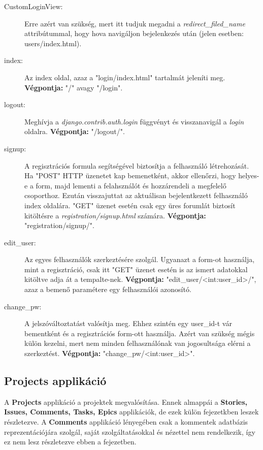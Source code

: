 \begin{itemize}
	\begin{description}
		\item[CustomLoginView:] Erre azért van szükség, mert itt tudjuk megadni a \textit{redirect\_filed\_name} attribútummal, hogy hova navigáljon bejelenkezés után (jelen esetben: users/index.html).
		\item[index:] Az index oldal, azaz a "login/index.html" tartalmát jeleníti meg. 
\textbf{Végpontja:} "/" avagy "/login".
		\item[logout:] Meghívja a  \textit{django.contrib.auth.login} függvényt és visszanavigál a \textit{login} oldalra. 
\textbf{Végpontja:} "/logout/".
		\item[signup:] A regisztrációs formula segítségével biztosítja a felhasználó létrehozását. Ha "POST" HTTP üzenetet kap bemenetként, akkor ellenőrzi, hogy helyes-e a form, majd lementi a felahsználót és hozzárendeli a megfelelő csoporthoz. Ezután visszajuttat az aktuálisan bejelentkezett felhasználó index oldalára. "GET" üzenet esetén csak egy üres forumlát biztosít kitöltésre a \textit{registration/signup.html} számára. 
\textbf{Végpontja:} "registration/signup/".
		\item[edit\_user:] Az egyes felhasználók szerkeztésére szolgál. Ugyanazt a form-ot használja, mint a regisztráció, csak itt "GET" üzenet esetén is az ismert adatokkal kitöltve adja át a tempalte-nek. 
\textbf{Végpontja:} "edit\_user/<int:user\_id>/", azaz a bemenő paramétere egy felhasználói azonosító.
		\item[change\_pw:] A jelszóváltoztatást valósítja meg. Ehhez szintén egy user\_id-t vár bementként és a regisztrációs form-ott használja. Azért van szükség mégis külön kezelni, mert nem minden felhasználónak van jogosultsága elérni a szerkeztést. 
\textbf{Végpontja:} "change\_pw/<int:user\_id>".
	\end{description}
\end{itemize}

\subsection{Projects applikáció}

A \textbf{Projects} applikáció a projektek megvalósítása. Ennek almappái a \textbf{Stories, Issues, Comments, Tasks, Epics} applikációk, de ezek külön fejezetkben leszek részletezve. A \textbf{Comments} applikáció lényegében csak a kommentek adatbázis reprezentációjára szolgál, saját szolgáltatásokkal és nézettel nem rendelkezik, így ez nem lesz részletezve ebben a fejezetben.

